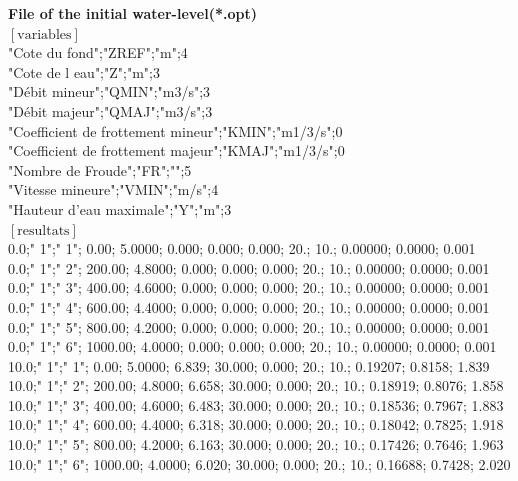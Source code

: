 \documentclass[a4paper,12pt]{article}
\begin{document}
\textbf{File of the initial water-level(*.opt)}\\ 
\vspace{0.5cm}
$[\text{variables}]$\\
 "Cote du fond";"ZREF";"m";4\\
 "Cote de l eau";"Z";"m";3\\
  "D\'ebit mineur";"QMIN";"m3/s";3\\
  "D\'ebit majeur";"QMAJ";"m3/s";3\\
  "Coefficient de frottement mineur";"KMIN";"m1/3/s";0\\
  "Coefficient de frottement majeur";"KMAJ";"m1/3/s";0\\
  "Nombre de Froude";"FR";"";5\\
  "Vitesse mineure";"VMIN";"m/s";4\\
  "Hauteur d'eau maximale";"Y";"m";3\\
$[\text{resultats}]$\\
   0.0;" 1";" 1";    0.00; 5.0000; 0.000;  0.000; 0.000; 20.; 10.; 0.00000; 0.0000; 0.001\\
   0.0;" 1";" 2";  200.00; 4.8000; 0.000;  0.000; 0.000; 20.; 10.; 0.00000; 0.0000; 0.001\\
   0.0;" 1";" 3";  400.00; 4.6000; 0.000;  0.000; 0.000; 20.; 10.; 0.00000; 0.0000; 0.001\\
   0.0;" 1";" 4";  600.00; 4.4000; 0.000;  0.000; 0.000; 20.; 10.; 0.00000; 0.0000; 0.001\\
   0.0;" 1";" 5";  800.00; 4.2000; 0.000;  0.000; 0.000; 20.; 10.; 0.00000; 0.0000; 0.001\\
   0.0;" 1";" 6"; 1000.00; 4.0000; 0.000;  0.000; 0.000; 20.; 10.; 0.00000; 0.0000; 0.001\\
  10.0;" 1";" 1";    0.00; 5.0000; 6.839; 30.000; 0.000; 20.; 10.; 0.19207; 0.8158; 1.839\\
  10.0;" 1";" 2";  200.00; 4.8000; 6.658; 30.000; 0.000; 20.; 10.; 0.18919; 0.8076; 1.858\\
  10.0;" 1";" 3";  400.00; 4.6000; 6.483; 30.000; 0.000; 20.; 10.; 0.18536; 0.7967; 1.883\\
  10.0;" 1";" 4";  600.00; 4.4000; 6.318; 30.000; 0.000; 20.; 10.; 0.18042; 0.7825; 1.918\\
  10.0;" 1";" 5";  800.00; 4.2000; 6.163; 30.000; 0.000; 20.; 10.; 0.17426; 0.7646; 1.963\\
  10.0;" 1";" 6"; 1000.00; 4.0000; 6.020; 30.000; 0.000; 20.; 10.; 0.16688; 0.7428; 2.020\\
\end{document}
